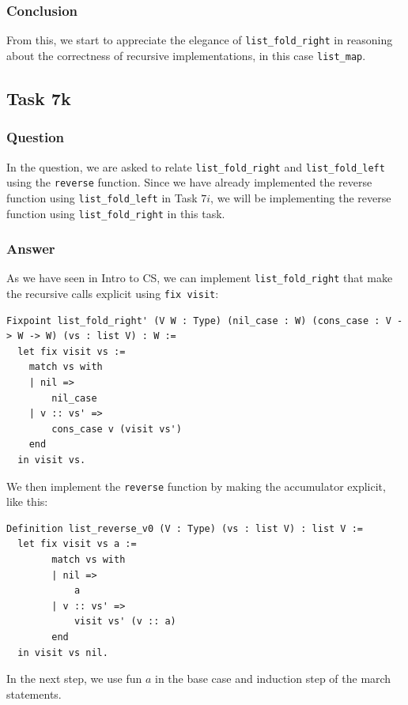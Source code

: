 \documentclass{article}
\begin{document}
\subsubsection{Conclusion}
From this, we start to appreciate the elegance of \texttt{list\_fold\_right} in reasoning about the correctness of recursive implementations, in this case \texttt{list\_map}.

\subsection{Task 7k}

\subsubsection{Question}
In the question, we are asked to relate \texttt{list\_fold\_right} and \texttt{list\_fold\_left} using the \texttt{reverse} function. Since we have already implemented the reverse function using \texttt{list\_fold\_left} in Task $7i$, we will be implementing the reverse function using \texttt{list\_fold\_right} in this task.

\subsubsection{Answer}

As we have seen in Intro to CS, we can implement \texttt{list\_fold\_right} that make the recursive calls explicit using \texttt{fix visit}:

\begin{lstlisting}
Fixpoint list_fold_right' (V W : Type) (nil_case : W) (cons_case : V -> W -> W) (vs : list V) : W :=
  let fix visit vs :=
    match vs with
    | nil =>
        nil_case
    | v :: vs' =>
        cons_case v (visit vs')
    end
  in visit vs.
\end{lstlisting}

We then implement the \texttt{reverse} function by making the accumulator explicit, like this:

\begin{lstlisting}
Definition list_reverse_v0 (V : Type) (vs : list V) : list V :=
  let fix visit vs a :=
        match vs with
        | nil =>
            a
        | v :: vs' =>
            visit vs' (v :: a)
        end
  in visit vs nil.
\end{lstlisting}

In the next step, we use fun $a$ in the base case and induction step of the march statements.
\end{document}
